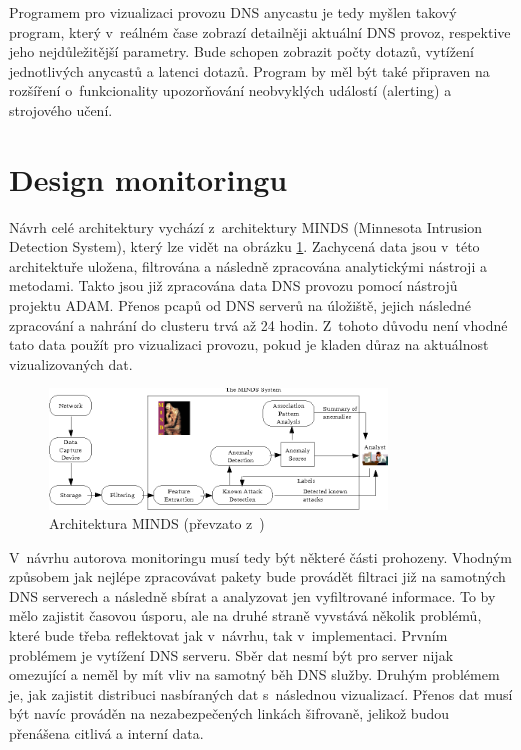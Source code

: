 \documentclass[thesis=M,czech]{src/FITthesis}[2019/12/23]
\begin{document}
Programem pro vizualizaci provozu DNS anycastu je tedy myšlen takový program, který v~reálném čase zobrazí detailněji aktuální DNS provoz, respektive jeho nejdůležitější parametry. Bude schopen zobrazit počty dotazů, vytížení jednotlivých anycastů a latenci dotazů. Program by měl být také připraven na rozšíření o~funkcionality upozorňování neobvyklých událostí (alerting) a strojového učení. 

\section{Design monitoringu}
Návrh celé architektury vychází z~architektury MINDS (Minnesota Intrusion Detection System), který lze vidět na obrázku \ref{fig:minds}. Zachycená data jsou v~této architektuře uložena, filtrována a následně zpracována analytickými nástroji a metodami. Takto jsou již zpracována data DNS provozu pomocí nástrojů projektu ADAM. Přenos pcapů od DNS serverů na úložiště, jejich následné zpracování a nahrání do clusteru trvá až 24 hodin. Z~tohoto důvodu není vhodné tato data použít pro vizualizaci provozu, pokud je kladen důraz na aktuálnost vizualizovaných dat. \cite{minds}

\begin{figure}[ht]
  \centering
   \includegraphics[width=0.8\textwidth]{images/minds.png}
   \caption{Architektura MINDS (převzato z~\cite{minds})}
     \label{fig:minds}
\end{figure}

V~návrhu autorova monitoringu musí tedy být některé části prohozeny. Vhodným způsobem jak nejlépe zpracovávat pakety bude provádět filtraci již na samotných DNS serverech a následně sbírat a analyzovat jen vyfiltrované informace. To by mělo zajistit časovou úsporu, ale na druhé straně vyvstává několik problémů, které bude třeba reflektovat jak v~návrhu, tak v~implementaci. Prvním problémem je vytížení DNS serveru. Sběr dat nesmí být pro server nijak omezující a neměl by mít vliv na samotný běh DNS služby. Druhým problémem je, jak zajistit distribuci nasbíraných dat s~následnou vizualizací. Přenos dat musí být navíc prováděn na nezabezpečených linkách šifrovaně, jelikož budou přenášena citlivá a interní data. 
\end{document}

